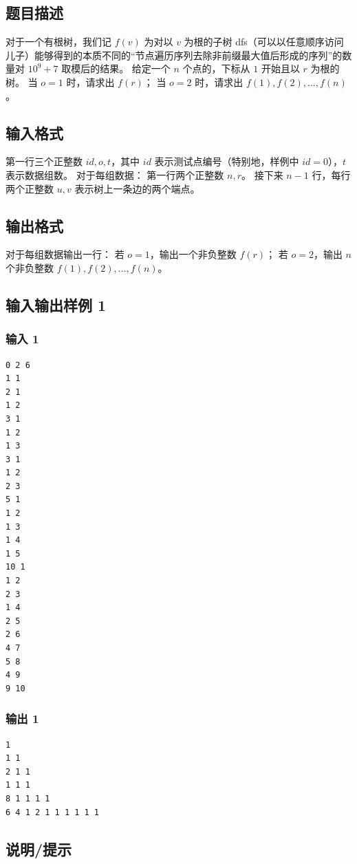 \documentclass[12pt,a4paper,oneside]{ctexart}
\begin{document}
\subsection*{题目描述}
对于一个有根树，我们记 $f(v)$ 为对以 $v$ 为根的子树 dfs（可以以任意顺序访问儿子）能够得到的本质不同的“节点遍历序列去除非前缀最大值后形成的序列”的数量对 $10^{9} + 7$ 取模后的结果。
给定一个 $n$ 个点的，下标从 $1$ 开始且以 $r$ 为根的树。
当 $o = 1$ 时，请求出 $f(r)$；
当 $o = 2$ 时，请求出 $f(1),f(2),\dots,f(n)$。
\subsection*{输入格式}
第一行三个正整数 $id,o,t$，其中 $id$ 表示测试点编号（特别地，样例中 $id = 0$），$t$ 表示数据组数。
对于每组数据：
第一行两个正整数 $n,r$。
接下来 $n-1$ 行，每行两个正整数 $u,v$ 表示树上一条边的两个端点。
\subsection*{输出格式}
对于每组数据输出一行：
若 $o = 1$，输出一个非负整数 $f(r)$；
若 $o = 2$，输出 $n$ 个非负整数 $f(1),f(2),\dots,f(n)$。
\subsection*{输入输出样例 1}
\subsubsection*{输入 1}
\begin{verbatim}
0 2 6
1 1
2 1
1 2
3 1
1 2
1 3
3 1
1 2
2 3
5 1
1 2
1 3
1 4
1 5
10 1
1 2
2 3
1 4
2 5
2 6
4 7
5 8
4 9
9 10
\end{verbatim}
\subsubsection*{输出 1}
\begin{verbatim}
1
1 1
2 1 1
1 1 1
8 1 1 1 1
6 4 1 2 1 1 1 1 1 1
\end{verbatim}
\subsection*{说明/提示}
\end{document}
